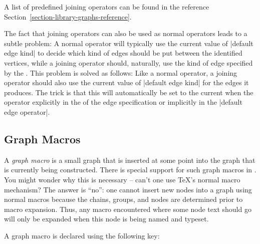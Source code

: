 A list of predefined joining operators can be found in the reference
Section~\ref{section-library-graphs-reference}.

The fact that joining operators can also be used as normal operators
leads to a subtle problem: A normal operator will typically use the
current value of |default edge kind| to decide which kind of edges
should be put between the identified vertices, while a joining
operator should, naturally, use the kind of edge specified by the
. This problem is solved as follows: Like a
normal operator, a joining operator should also use the current value
of |default edge kind| for the edges it produces. The trick is that
this will automatically be set to the current  when the operator explicitly in the  of
the edge specification or implicitly in the |default edge operator|.




\subsection{Graph Macros}
\label{section-library-graphs-macros}

A \emph{graph macro} is a small graph that is inserted at some point
into the graph that is currently being constructed. There is special
support for such graph macros in \tikzname. You might wonder why this
is necessary -- can't one use \TeX's normal macro mechanism? The
answer is ``no'': one cannot insert new nodes into a graph using
normal macros because the chains, groups, and nodes are determined
prior to macro expansion. Thus, any macro encountered where some node
text should go will only be expanded when this node is being named and 
typeset.

A graph macro is declared using the following key:

